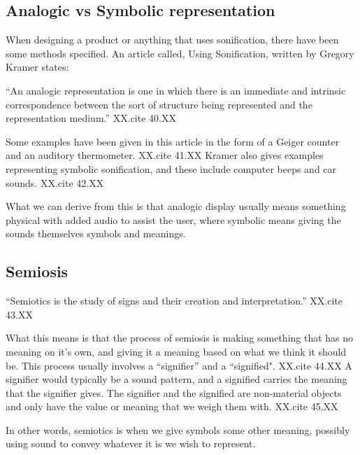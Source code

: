 

\FloatBarrier
\subsection{Analogic vs Symbolic representation} %
\label{sub:analogic_vs_symbolic_representation}

When designing a product or anything that uses sonification, there have been some methods specified. An article called, Using Sonification, written by Gregory Kramer states:

\enquote{An analogic representation is one in which there is an immediate and intrinsic correspondence between the sort of structure being represented and the representation medium.} XX.cite 40.XX

Some examples have been given in this article in the form of a Geiger counter and an auditory thermometer. XX.cite 41.XX
Kramer also gives examples representing symbolic sonification, and these include computer beeps and car sounds. XX.cite 42.XX

What we can derive from this is that analogic display usually means something physical with added audio to assist the user, where symbolic means giving the sounds themselves symbols and meanings.


\FloatBarrier
\subsection{Semiosis} %
\label{sub:semiosis}


\enquote{Semiotics is the study of signs and their creation and interpretation.} XX.cite 43.XX

What this means is that the process of semiosis is making something that has no meaning on it’s own, and giving it a meaning based on what we think it should be. This process usually involves a “signifier” and a “signified". XX.cite 44.XX
A signifier would typically be a sound pattern, and a signified carries the meaning that the signifier gives. The signifier and the signified are non-material objects and only have the value or meaning that we weigh them with. XX.cite 45.XX

In other words, semiotics is when we give symbols some other meaning, possibly using sound to convey whatever it is we wish to represent. 

